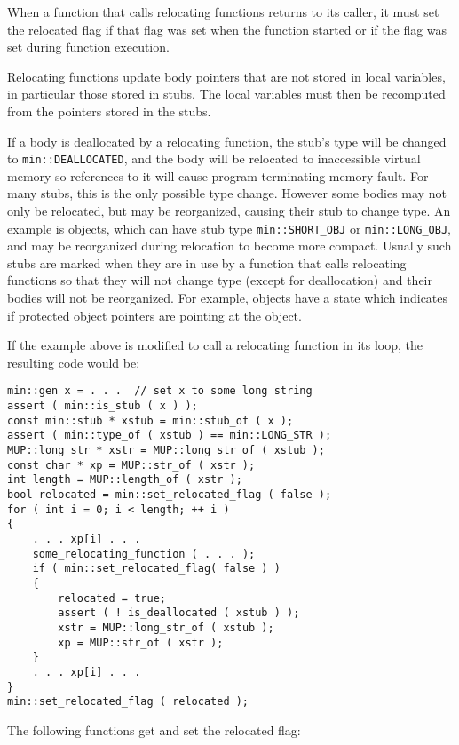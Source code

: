 \documentclass[12pt]{article}
\newcommand{\EOL}{\penalty \exhyphenpenalty}
\newenvironment{indpar}[1][0.3in]%
	{\begin{list}{}%
		     {\setlength{\itemsep}{0in}%
		      \setlength{\topsep}{0in}%
		      \setlength{\parsep}{1ex}%
		      \setlength{\labelwidth}{#1}%
		      \setlength{\leftmargin}{#1}%
		      \addtolength{\leftmargin}{\labelsep}}%
	 \item}%
	{\end{list}}
\begin{document}
When a function that calls relocating functions returns to its caller,
it must set the relocated
flag if that flag was set when the function started or if the
flag was set during function execution.

Relocating functions update body pointers that are not stored
in local variables, in particular those stored in stubs.
The local variables must then be recomputed from the pointers stored in
the stubs.

If a body is deallocated by a relocating function,
the stub's type will be changed to
{\tt min::\EOL DEALLOCATED}, and the body will be relocated to inaccessible
virtual memory so references to it will cause program terminating
memory fault.  For many stubs, this is the only possible 
type change.  However some bodies may not only be relocated, but
may be reorganized, causing their stub to change type.  An example
is objects, which can have stub type {\tt min::\EOL SHORT\_\EOL OBJ} or
{\tt min::\EOL LONG\_\EOL OBJ}, and may be reorganized during relocation to
become more compact.  Usually such stubs are marked when they
are in use by a function that calls relocating functions so that
they will not change type (except for deallocation) and their
bodies will not be reorganized.  For example, objects have a state
which indicates if protected object pointers are pointing at the
object.

If the example above is modified to call a relocating function
in its loop, the resulting code would be:
\begin{indpar}\begin{verbatim}
min::gen x = . . .  // set x to some long string
assert ( min::is_stub ( x ) );
const min::stub * xstub = min::stub_of ( x );
assert ( min::type_of ( xstub ) == min::LONG_STR );
MUP::long_str * xstr = MUP::long_str_of ( xstub );
const char * xp = MUP::str_of ( xstr );
int length = MUP::length_of ( xstr );
bool relocated = min::set_relocated_flag ( false );
for ( int i = 0; i < length; ++ i )
{
    . . . xp[i] . . .
    some_relocating_function ( . . . );
    if ( min::set_relocated_flag( false ) )
    {
        relocated = true;
        assert ( ! is_deallocated ( xstub ) );
        xstr = MUP::long_str_of ( xstub );
        xp = MUP::str_of ( xstr );
    }
    . . . xp[i] . . .
}
min::set_relocated_flag ( relocated );
\end{verbatim}\end{indpar}

The following functions get and set the relocated flag:
\end{document}

